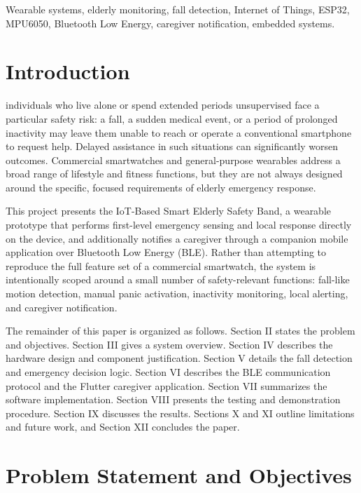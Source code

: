 \documentclass[lettersize,journal]{IEEEtran}
\begin{document}
\begin{IEEEkeywords}
Wearable systems, elderly monitoring, fall detection, Internet of Things, ESP32, MPU6050, Bluetooth Low Energy, caregiver notification, embedded systems.
\end{IEEEkeywords}

\IEEEpeerreviewmaketitle

\section{Introduction}
 individuals who live alone or spend extended periods unsupervised face a particular safety risk: a fall, a sudden medical event, or a period of prolonged inactivity may leave them unable to reach or operate a conventional smartphone to request help. Delayed assistance in such situations can significantly worsen outcomes. Commercial smartwatches and general-purpose wearables address a broad range of lifestyle and fitness functions, but they are not always designed around the specific, focused requirements of elderly emergency response.

This project presents the IoT-Based Smart Elderly Safety Band, a wearable prototype that performs first-level emergency sensing and local response directly on the device, and additionally notifies a caregiver through a companion mobile application over Bluetooth Low Energy (BLE). Rather than attempting to reproduce the full feature set of a commercial smartwatch, the system is intentionally scoped around a small number of safety-relevant functions: fall-like motion detection, manual panic activation, inactivity monitoring, local alerting, and caregiver notification.

The remainder of this paper is organized as follows. Section II states the problem and objectives. Section III gives a system overview. Section IV describes the hardware design and component justification. Section V details the fall detection and emergency decision logic. Section VI describes the BLE communication protocol and the Flutter caregiver application. Section VII summarizes the software implementation. Section VIII presents the testing and demonstration procedure. Section IX discusses the results. Sections X and XI outline limitations and future work, and Section XII concludes the paper.

\section{Problem Statement and Objectives}
\end{document}
